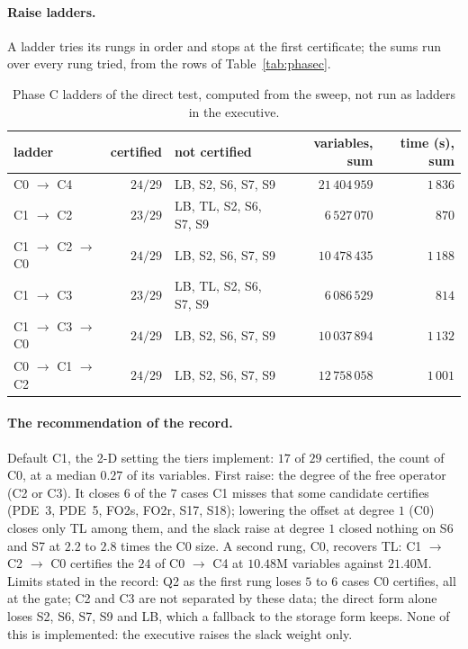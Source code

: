 \paragraph{Raise ladders.} A ladder tries its rungs in order and stops at the first certificate; the sums run over every rung tried, from the rows of Table~\ref{tab:phasec}.
\begin{table}[h]\centering\scriptsize
\setlength{\tabcolsep}{4pt}
\begin{tabular}{lrlrr}
\toprule
ladder & certified & not certified & variables, sum & time (s), sum \\
\midrule
C0 $\to$ C4 & $24/29$ & LB, S2, S6, S7, S9 & $21\,404\,959$ & $1\,836$ \\
C1 $\to$ C2 & $23/29$ & LB, TL, S2, S6, S7, S9 & $6\,527\,070$ & $870$ \\
C1 $\to$ C2 $\to$ C0 & $24/29$ & LB, S2, S6, S7, S9 & $10\,478\,435$ & $1\,188$ \\
C1 $\to$ C3 & $23/29$ & LB, TL, S2, S6, S7, S9 & $6\,086\,529$ & $814$ \\
C1 $\to$ C3 $\to$ C0 & $24/29$ & LB, S2, S6, S7, S9 & $10\,037\,894$ & $1\,132$ \\
C0 $\to$ C1 $\to$ C2 & $24/29$ & LB, S2, S6, S7, S9 & $12\,758\,058$ & $1\,001$ \\
\bottomrule
\end{tabular}
\caption{Phase C ladders of the direct test, computed from the sweep, not run as ladders in the executive.}\label{tab:phasec-ladder}
\end{table}

\paragraph{The recommendation of the record.} Default C1, the 2-D setting the tiers implement: $17$ of $29$ certified, the count of C0, at a median $0.27$ of its variables. First raise: the degree of the free operator (C2 or C3). It closes $6$ of the $7$ cases C1 misses that some candidate certifies (PDE~3, PDE~5, FO2s, FO2r, S17, S18); lowering the offset at degree $1$ (C0) closes only TL among them, and the slack raise at degree $1$ closed nothing on S6 and S7 at $2.2$ to $2.8$ times the C0 size. A second rung, C0, recovers TL: C1 $\to$ C2 $\to$ C0 certifies the $24$ of C0 $\to$ C4 at $10.48$M variables against $21.40$M. Limits stated in the record: Q2 as the first rung loses $5$ to $6$ cases C0 certifies, all at the gate; C2 and C3 are not separated by these data; the direct form alone loses S2, S6, S7, S9 and LB, which a fallback to the storage form keeps. None of this is implemented: the executive raises the slack weight only.

